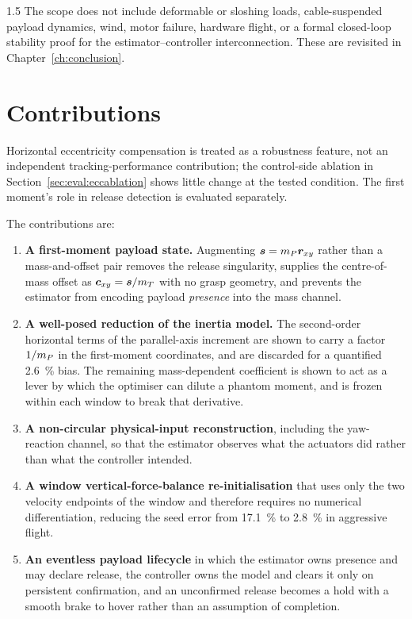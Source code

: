 \begin{spacing}{1.5}
The scope does not include deformable or sloshing loads, cable-suspended payload
dynamics, wind, motor failure, hardware flight, or a formal closed-loop stability
proof for the estimator--controller interconnection. These are revisited in
Chapter~\ref{ch:conclusion}.

\section{Contributions}

Horizontal eccentricity compensation is treated as a robustness feature, not
an independent tracking-performance contribution; the control-side ablation in
Section~\ref{sec:eval:eccablation} shows little change at the tested condition.
The first moment's role in release detection is evaluated separately.

The contributions are:
\begin{enumerate}
\item \textbf{A first-moment payload state.} Augmenting $\bm{s}=m_P\bm r_{xy}$
rather than a mass-and-offset pair removes the release singularity, supplies the
centre-of-mass offset as $\bm{c}_{xy}=\bm{s}/m_T$ with no grasp geometry, and prevents
the estimator from encoding payload \emph{presence} into the mass channel.

\item \textbf{A well-posed reduction of the inertia model.} The second-order
horizontal terms of the parallel-axis increment are shown to carry a factor
$1/m_P$ in the first-moment coordinates, and are discarded for a quantified
\SI{2.6}{\percent} bias. The remaining mass-dependent coefficient is shown to act
as a lever by which the optimiser can dilute a phantom moment, and is frozen
within each window to break that derivative.

\item \textbf{A non-circular physical-input reconstruction}, including the
yaw-reaction channel, so that the estimator observes what the actuators did
rather than what the controller intended.

\item \textbf{A window vertical-force-balance re-initialisation} that uses only
the two velocity endpoints of the window and therefore requires no numerical
differentiation, reducing the seed error from \SI{17.1}{\percent} to
\SI{2.8}{\percent} in aggressive flight.

\item \textbf{An eventless payload lifecycle} in which the estimator owns
presence and may declare release, the controller owns the model and clears it
only on persistent confirmation, and an unconfirmed release becomes a hold with a
smooth brake to hover rather than an assumption of completion.


\end{enumerate}
\end{spacing}
